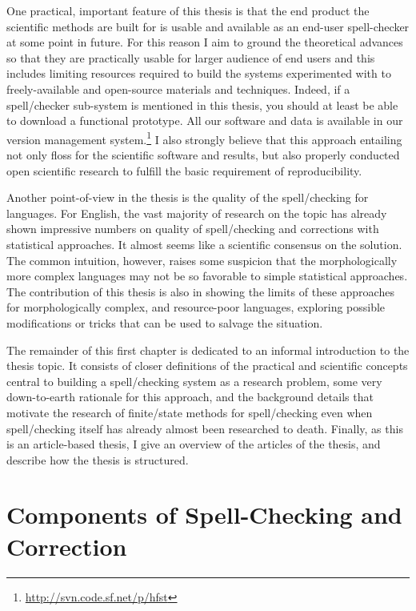\documentclass[officiallayout,final]{unihelcompling}
\begin{document}
One practical, important feature of this thesis is that the end product the
scientific methods are built for is usable and available as an end-user
spell-checker at some point in future. For this reason I aim to ground the
theoretical advances so that they are practically usable for larger audience of
end users and this includes limiting resources required to build the systems
experimented with to freely-available and open-source materials and techniques.
Indeed, if a spell\-/checker sub-system is mentioned in this thesis, you
should at least be able to download a functional prototype.  All our software
and data is available in our version management
system.\footnote{\url{http://svn.code.sf.net/p/hfst}} I also strongly believe
that this approach entailing not only \gls{floss} for
the scientific software and results, but also properly conducted open
scientific research to fulfill the basic requirement of reproducibility.

Another point-of-view in the thesis is the quality of the spell\-/checking for
 languages. For
English, the vast majority of research on the topic has already shown
impressive numbers on quality of spell\-/checking and corrections with
statistical approaches. It almost seems like a scientific consensus on the
solution. The common intuition, however, raises some suspicion that the
morphologically more complex languages may not be so favorable to simple
statistical approaches. The contribution of this thesis is also in showing the
limits of these approaches for morphologically complex, and resource-poor
languages, exploring possible modifications or tricks that can be used to
salvage the situation.

The remainder of this first chapter is dedicated to an informal introduction to
the thesis topic. It consists of closer definitions of the practical and
scientific concepts central to building a spell\-/checking system as a research
problem, some very down-to-earth rationale for this approach, and the
background details that motivate the research of finite\-/state methods for
spell\-/checking even when spell\-/checking itself has already almost been
researched to death. Finally, as this is an article-based thesis, I give an
overview of the articles of the thesis, and describe how the thesis is
structured.

\section{Components of Spell-Checking and Correction}
\label{sec:practical-components}
\end{document}
